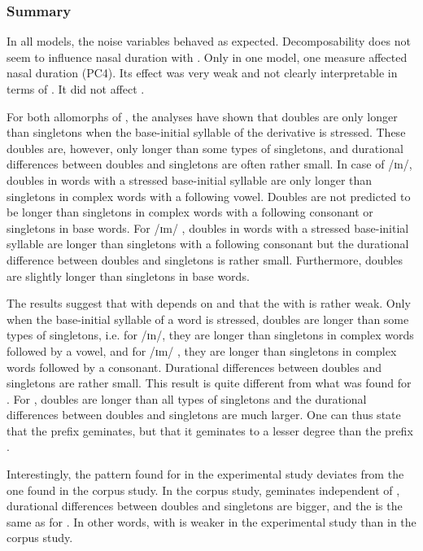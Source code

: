\subsubsection{Summary}


In all models, the noise variables behaved as expected. Decomposability does not seem to influence nasal duration with . Only in one model, one  measure affected nasal duration (\textsc{PC4}). Its effect was very weak and not clearly interpretable in terms of . It did not affect .


For both allomorphs of , the analyses have shown that doubles are only longer than singletons when the base-initial syllable of the derivative is stressed. These doubles are, however, only longer than some types of singletons, and durational differences between doubles and singletons are often rather small. 
In case of /ɪn/, doubles in words with a stressed base-initial syllable are only longer than singletons in complex words with a following vowel. Doubles are not predicted to be longer than singletons in complex words with a following consonant or singletons in base words. 
For /ɪm/ , doubles in words with a stressed base-initial syllable are longer than singletons with a following consonant but the durational difference between doubles and singletons is rather small.
Furthermore, doubles are slightly longer than singletons in base words.


The results suggest that  with  depends on  and that the  with  is rather weak. Only when the base-initial syllable of a word is stressed, doubles are longer than some types of singletons, i.e. for /ɪn/, they are longer than singletons in complex words followed by a vowel, and for /ɪm/ , they are longer than singletons in complex words followed by a consonant. Durational differences between doubles and singletons are rather small. This result is quite different from what was found for . For , doubles are longer than all types of singletons and the durational differences between doubles and singletons are much larger. One can thus state that the prefix  geminates, but that it geminates to a lesser degree than the prefix .

Interestingly, the  pattern found for  in the experimental study deviates from the one found in the corpus study. In the corpus study,  geminates independent of , durational differences between doubles and singletons are bigger, and the  is the same as for . In other words,  with  is weaker in the experimental study than in the corpus study.

